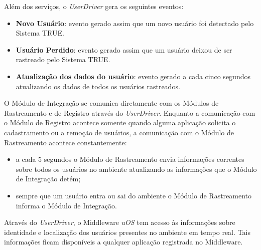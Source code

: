 Além dos serviços, o \textit{UserDriver} gera os seguintes eventos:

	\begin{itemize}
		\item \textbf{Novo Usuário}: evento gerado assim que um novo usuário foi detectado pelo Sistema TRUE.
		\item \textbf{Usuário Perdido}: evento gerado assim que um usuário deixou de ser rastreado pelo Sistema TRUE.
		\item \textbf{Atualização dos dados do usuário}: evento gerado a cada cinco segundos atualizando os dados de todos os usuários rastreados.
	\end{itemize}

	O Módulo de Integração se comunica diretamente com os Módulos de Rastreamento e de
	Registro através do \textit{UserDriver}. Enquanto a comunicação com o Módulo de
	Registro acontece somente quando alguma aplicação solicita o cadastramento ou a remoção
	de usuários, a comunicação com o Módulo de Rastreamento acontece constantemente:

	\begin{itemize}
		\item a cada 5 segundos o Módulo de Rastreamento envia informações correntes sobre todos os usuários no ambiente atualizando as informações que o Módulo de Integração detém;
		\item sempre que um usuário entra ou sai do ambiente o Módulo de Rastreamento informa o Módulo de Integração.
	\end{itemize} 

	Através do \textit{UserDriver}, o Middleware \textit{uOS} tem acesso às
	informações sobre identidade e localização dos usuários presentes no ambiente em
	tempo real. Tais informações ficam disponíveis a qualquer aplicação registrada
	no Middleware.
